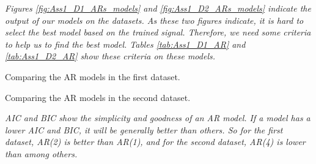 \textit{Figures \ref{fig:Ass1_D1_ARs_models} and \ref{fig:Ass1_D2_ARs_models} indicate the output of our models on the datasets. As these two figures indicate, it is hard to select the best model based on the trained signal. Therefore, we need some criteria to help us to find the best model. Tables \ref{tab:Ass1_D1_AR} and \ref{tab:Ass1_D2_AR} show these criteria on these models. }

\begin{table}[H]
\centering
\caption{Comparing the \gls{AR} models in the first dataset.}
\label{tab:Ass1_D1_AR}

\end{table}

\begin{table}[H]
\centering
\caption{Comparing the \gls{AR} models in the second dataset.}
\label{tab:Ass1_D2_AR}

\end{table}



\textit{\Gls{AIC} and \gls{BIC} show the simplicity and goodness of an \gls{AR} model. If a model has a lower \Gls{AIC} and \gls{BIC}, it will be generally better than others. So for the first dataset, \gls{AR}(2) is better than \gls{AR}(1), and for the second dataset, \gls{AR}(4) is lower than among others.}

